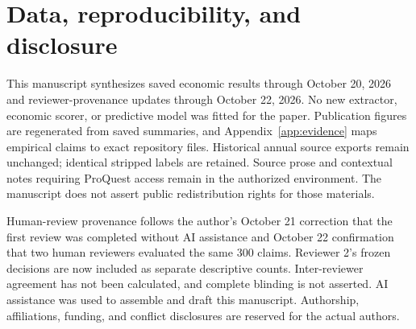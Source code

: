 \section*{Data, reproducibility, and disclosure}
This manuscript synthesizes saved economic results through October 20, 2026 and reviewer-provenance updates through October 22, 2026. No new extractor, economic scorer, or predictive model was fitted for the paper. Publication figures are regenerated from saved summaries, and Appendix~\ref{app:evidence} maps empirical claims to exact repository files. Historical annual source exports remain unchanged; identical stripped labels are retained. Source prose and contextual notes requiring ProQuest access remain in the authorized environment. The manuscript does not assert public redistribution rights for those materials.

Human-review provenance follows the author's October 21 correction that the first review was completed without AI assistance and October 22 confirmation that two human reviewers evaluated the same 300 claims. Reviewer 2's frozen decisions are now included as separate descriptive counts. Inter-reviewer agreement has not been calculated, and complete blinding is not asserted. AI assistance was used to assemble and draft this manuscript. Authorship, affiliations, funding, and conflict disclosures are reserved for the actual authors.

